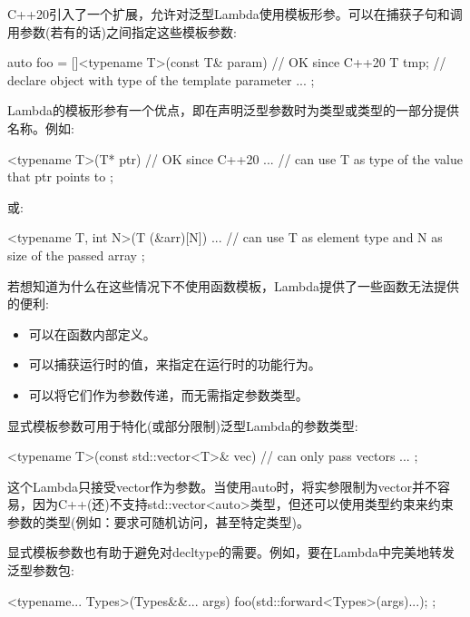 

C++20引入了一个扩展，允许对泛型Lambda使用模板形参。可以在捕获子句和调用参数(若有的话)之间指定这些模板参数:

\begin{cpp}
auto foo = []<typename T>(const T& param) { // OK since C++20
				T tmp{}; // declare object with type of the template parameter
				...
			};
\end{cpp}

Lambda的模板形参有一个优点，即在声明泛型参数时为类型或类型的一部分提供名称。例如:

\begin{cpp}
[]<typename T>(T* ptr) { // OK since C++20
	... // can use T as type of the value that ptr points to
};
\end{cpp}

或:

\begin{cpp}
[]<typename T, int N>(T (&arr)[N]) {
	... // can use T as element type and N as size of the passed array
};
\end{cpp}

若想知道为什么在这些情况下不使用函数模板，Lambda提供了一些函数无法提供的便利:

\begin{itemize}
\item
可以在函数内部定义。

\item
可以捕获运行时的值，来指定在运行时的功能行为。

\item
可以将它们作为参数传递，而无需指定参数类型。
\end{itemize}



显式模板参数可用于特化(或部分限制)泛型Lambda的参数类型:

\begin{cpp}
[]<typename T>(const std::vector<T>& vec) { // can only pass vectors
	...
};
\end{cpp}

这个Lambda只接受vector作为参数。当使用auto时，将实参限制为vector并不容易，因为C++(还)不支持std::vector<auto>类型，但还可以使用类型约束来约束参数的类型(例如：要求可随机访问，甚至特定类型)。

显式模板参数也有助于避免对decltype的需要。例如，要在Lambda中完美地转发泛型参数包:

\begin{cpp}
[]<typename... Types>(Types&&... args) {
	foo(std::forward<Types>(args)...);
};
\end{cpp}

